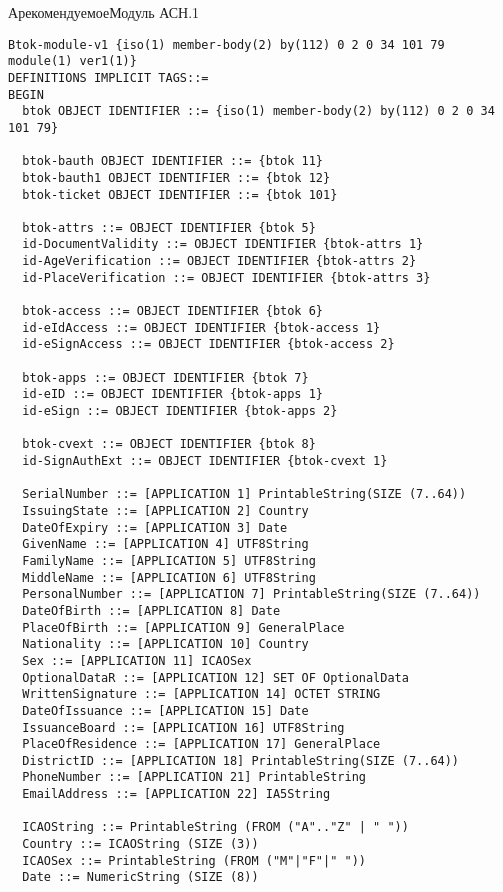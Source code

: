 \begin{appendix}{А}{рекомендуемое}{Модуль АСН.1}
\label{ASN.modul}


\begin{verbatim}
Btok-module-v1 {iso(1) member-body(2) by(112) 0 2 0 34 101 79 module(1) ver1(1)}
DEFINITIONS IMPLICIT TAGS::=
BEGIN
  btok OBJECT IDENTIFIER ::= {iso(1) member-body(2) by(112) 0 2 0 34 101 79}

  btok-bauth OBJECT IDENTIFIER ::= {btok 11}
  btok-bauth1 OBJECT IDENTIFIER ::= {btok 12}
  btok-ticket OBJECT IDENTIFIER ::= {btok 101}

  btok-attrs ::= OBJECT IDENTIFIER {btok 5}
  id-DocumentValidity ::= OBJECT IDENTIFIER {btok-attrs 1}
  id-AgeVerification ::= OBJECT IDENTIFIER {btok-attrs 2}
  id-PlaceVerification ::= OBJECT IDENTIFIER {btok-attrs 3}

  btok-access ::= OBJECT IDENTIFIER {btok 6}
  id-eIdAccess ::= OBJECT IDENTIFIER {btok-access 1}
  id-eSignAccess ::= OBJECT IDENTIFIER {btok-access 2}

  btok-apps ::= OBJECT IDENTIFIER {btok 7}
  id-eID ::= OBJECT IDENTIFIER {btok-apps 1}
  id-eSign ::= OBJECT IDENTIFIER {btok-apps 2}

  btok-cvext ::= OBJECT IDENTIFIER {btok 8}
  id-SignAuthExt ::= OBJECT IDENTIFIER {btok-cvext 1}

  SerialNumber ::= [APPLICATION 1] PrintableString(SIZE (7..64))
  IssuingState ::= [APPLICATION 2] Country
  DateOfExpiry ::= [APPLICATION 3] Date
  GivenName ::= [APPLICATION 4] UTF8String
  FamilyName ::= [APPLICATION 5] UTF8String
  MiddleName ::= [APPLICATION 6] UTF8String
  PersonalNumber ::= [APPLICATION 7] PrintableString(SIZE (7..64))
  DateOfBirth ::= [APPLICATION 8] Date
  PlaceOfBirth ::= [APPLICATION 9] GeneralPlace
  Nationality ::= [APPLICATION 10] Country
  Sex ::= [APPLICATION 11] ICAOSex
  OptionalDataR ::= [APPLICATION 12] SET OF OptionalData
  WrittenSignature ::= [APPLICATION 14] OCTET STRING
  DateOfIssuance ::= [APPLICATION 15] Date
  IssuanceBoard ::= [APPLICATION 16] UTF8String
  PlaceOfResidence ::= [APPLICATION 17] GeneralPlace
  DistrictID ::= [APPLICATION 18] PrintableString(SIZE (7..64))
  PhoneNumber ::= [APPLICATION 21] PrintableString
  EmailAddress ::= [APPLICATION 22] IA5String
  
  ICAOString ::= PrintableString (FROM ("A".."Z" | " "))
  Country ::= ICAOString (SIZE (3))
  ICAOSex ::= PrintableString (FROM ("M"|"F"|" "))
  Date ::= NumericString (SIZE (8))
  

\end{verbatim}
\end{appendix}
